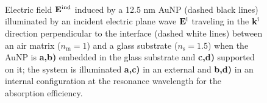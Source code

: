 \begin{figure}[t!]\centering
   \def\svgwidth{.75 \textwidth}
   \footnotesize
   \\[-32.6em]
   \hspace*{-.25\textwidth}
       \begin{subfigure}{.25\textwidth}\textcolor{red}{\caption{ } \label{sfig:Near:EE}}\end{subfigure}%
       \begin{subfigure}{.36\textwidth}\caption{ }\label{sfig:Near:EI}\end{subfigure}\\[13em]
   \hspace*{-.25\textwidth}
       \begin{subfigure}{.25\textwidth}\caption{ } \label{sfig:Near:SE}\end{subfigure}%
       \begin{subfigure}{.36\textwidth}\caption{ }\label{sfig:Near:SI}\end{subfigure}\\[15em]
   \caption[Induced Electric Field of a 12.5 nm Au Spherical NP embbeded into (supported on) a substrate illuminated at a normal incidence]{Electric field $\vb{E}^\text{ind}$ induced by a 12.5 nm AuNP (dashed black lines) illuminated by an incident electric plane wave $\vb{E}^\text{i}$ traveling in the $\vb{k}^\text{i}$ direction perpendicular to the interface  (dashed white lines) between an air matrix ($n_\text{m} = 1$) and a glass substrate ($n_\text{s} = 1.5$) when the AuNP is  \textbf{a,b)} embedded in the glass substrate and \textbf{c,d)} supported on it; the system is illuminated \textbf{a,c)}  in an external and \textbf{b,d)} in an internal configuration at the resonance wavelength for the absorption efficiency.
   }
   \label{fig:Near:IntExt}
 \end{figure}

